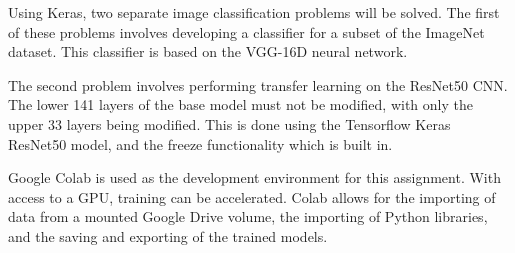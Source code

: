 Using Keras, two separate image classification problems will be solved. The
first of these problems involves developing a classifier for a subset of the
ImageNet dataset. This classifier is based on the VGG-16D neural network.

The second problem involves performing transfer learning on the ResNet50 CNN.
The lower 141 layers of the base model must not be modified, with only the upper
33 layers being modified. This is done using the Tensorflow Keras ResNet50
model, and the freeze functionality which is built in.

Google Colab is used as the development environment for this assignment. With
access to a GPU, training can be accelerated. Colab allows for the importing of
data from a mounted Google Drive volume, the importing of Python libraries, and
the saving and exporting of the trained models.
